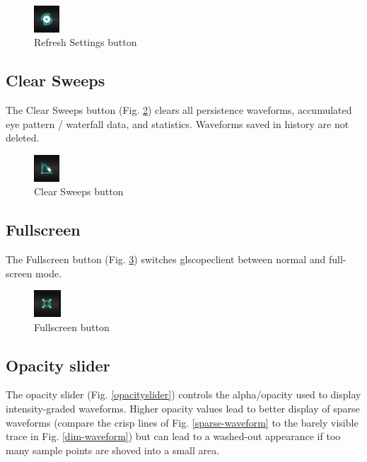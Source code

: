 \begin{figure}[h]
\centering
\includegraphics[height=1cm]{images/refresh-button.png}
\caption{Refresh Settings button}
\label{refreshbutton}
\end{figure}

\subsection{Clear Sweeps}

The Clear Sweeps button (Fig. \ref{clearbutton}) clears all persistence waveforms, accumulated eye pattern / waterfall
data, and statistics. Waveforms saved in history are not deleted.

\begin{figure}[h]
\centering
\includegraphics[height=1cm]{images/clear-button.png}
\caption{Clear Sweeps button}
\label{clearbutton}
\end{figure}

\subsection{Fullscreen}

The Fullscreen button (Fig. \ref{fullscreenbutton}) switches glscopeclient between normal and full-screen mode.

\begin{figure}[h]
\centering
\includegraphics[height=1cm]{images/fullscreen-button.png}
\caption{Fullscreen button}
\label{fullscreenbutton}
\end{figure}

\subsection{Opacity slider}

The opacity slider (Fig. \ref{opacityslider}) controls the alpha/opacity used to display intensity-graded waveforms.
Higher opacity values lead to better display of sparse waveforms (compare the crisp lines of Fig. \ref{sparse-waveform}
to the barely visible trace in Fig. \ref{dim-waveform}) but can lead to a washed-out appearance if too many sample
points are shoved into a small area.

